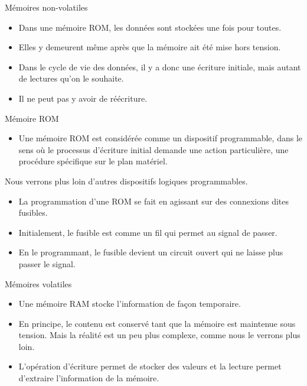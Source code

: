 \documentclass[presentation]{beamer}
\begin{document}
\begin{frame}[label={sec:org2eb195d}]{Mémoires non-volatiles}
\begin{itemize}
\item Dans une mémoire ROM, les données sont stockées une fois pour toutes.

\item Elles y demeurent même après que la mémoire ait été mise hors tension.

\item Dans le cycle de vie des données, il y a donc \alert{une} écriture initiale, mais autant de lectures qu'on le souhaite.

\item Il ne peut pas y avoir de réécriture.
\end{itemize}
\end{frame}

\begin{frame}[label={sec:orgd7fc187}]{Mémoire ROM}
\begin{itemize}
\item Une mémoire ROM est considérée comme un dispositif \alert{programmable}, dans le sens où le processus d'écriture initial demande une action particulière, une procédure spécifique sur le plan matériel.
\end{itemize}

Nous verrons
plus loin d'autres dispositifs logiques programmables.

\begin{itemize}
\item La programmation d'une ROM se fait en agissant sur des connexions dites \alert{fusibles}.

\item Initialement, le fusible est comme un fil qui permet au signal de passer.

\item En le programmant, le fusible devient un circuit ouvert qui ne laisse plus passer le signal.
\end{itemize}
\end{frame}

\begin{frame}[label={sec:orgdc9afb8}]{Mémoires volatiles}
\begin{itemize}
\item Une mémoire RAM stocke l'information de façon temporaire.

\item En principe, le contenu est conservé tant que la mémoire est maintenue sous tension. Mais la réalité est un peu plus complexe, comme nous le verrons plus loin.

\item L'opération d'\alert{écriture} permet de stocker des valeurs et la \alert{lecture} permet d'extraire l'information de la mémoire.
\end{itemize}
\end{frame}
\end{document}
